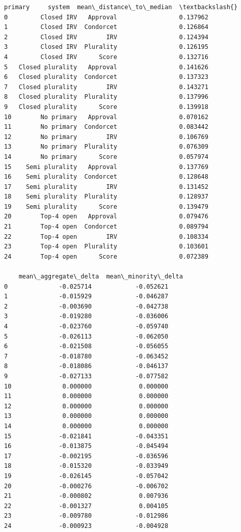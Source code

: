 \documentclass[11pt]{article}
\makeatletter
\newcommand{\boxspacing}{\kern\kvtcb@left@rule\kern\kvtcb@boxsep}
\newcommand{\prompt}[4]{
        {\ttfamily\llap{{\color{#2}[#3]:\hspace{3pt}#4}}\vspace{-\baselineskip}}
    }
\makeatother
\begin{document}
            \begin{tcolorbox}[breakable, size=fbox, boxrule=.5pt, pad at break*=1mm, opacityfill=0]
\prompt{Out}{outcolor}{106}{\boxspacing}
\begin{Verbatim}[commandchars=\\\{\}]
             primary     system  mean\_distance\_to\_median  \textbackslash{}
0         Closed IRV   Approval                 0.137962
1         Closed IRV  Condorcet                 0.126864
2         Closed IRV        IRV                 0.124394
3         Closed IRV  Plurality                 0.126195
4         Closed IRV      Score                 0.132716
5   Closed plurality   Approval                 0.141626
6   Closed plurality  Condorcet                 0.137323
7   Closed plurality        IRV                 0.143271
8   Closed plurality  Plurality                 0.137996
9   Closed plurality      Score                 0.139918
10        No primary   Approval                 0.070162
11        No primary  Condorcet                 0.083442
12        No primary        IRV                 0.106769
13        No primary  Plurality                 0.076309
14        No primary      Score                 0.057974
15    Semi plurality   Approval                 0.137769
16    Semi plurality  Condorcet                 0.128648
17    Semi plurality        IRV                 0.131452
18    Semi plurality  Plurality                 0.128937
19    Semi plurality      Score                 0.139479
20        Top-4 open   Approval                 0.079476
21        Top-4 open  Condorcet                 0.089794
22        Top-4 open        IRV                 0.108334
23        Top-4 open  Plurality                 0.103601
24        Top-4 open      Score                 0.072389

    mean\_aggregate\_delta  mean\_minority\_delta
0              -0.025714            -0.052621
1              -0.015929            -0.046287
2              -0.003690            -0.042738
3              -0.019280            -0.036006
4              -0.023760            -0.059740
5              -0.026113            -0.062050
6              -0.021508            -0.056055
7              -0.018780            -0.063452
8              -0.018086            -0.046137
9              -0.027133            -0.077582
10              0.000000             0.000000
11              0.000000             0.000000
12              0.000000             0.000000
13              0.000000             0.000000
14              0.000000             0.000000
15             -0.021841            -0.043351
16             -0.013875            -0.045494
17             -0.002195            -0.036596
18             -0.015320            -0.033949
19             -0.026145            -0.057042
20             -0.000276            -0.006702
21             -0.000802             0.007936
22             -0.001327             0.004105
23             -0.009780            -0.012986
24             -0.000923            -0.004928
\end{Verbatim}
\end{tcolorbox}
        
\end{document}

